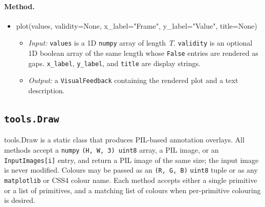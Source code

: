 \documentclass{llmxive}
\providecommand{\apicode}[1]{#1}
\begin{document}
\paragraph{Method.}
\begin{itemize}[leftmargin=1.5em]
\item \apicode{plot(values, validity=None, x_label="Frame", y_label="Value", title=None)}
  \begin{itemize}
  \item \emph{Input:} \texttt{values} is a 1D \texttt{numpy} array of length~$T$. \texttt{validity} is an optional 1D boolean array of the same length whose \texttt{False} entries are rendered as gaps. \texttt{x\_label}, \texttt{y\_label}, and \texttt{title} are display strings.
  \item \emph{Output:} a \texttt{VisualFeedback} containing the rendered plot and a text description.
  \end{itemize}
\end{itemize}

\subsection{\texttt{tools.Draw}}
\label{app:tool_draw}
\apicode{tools.Draw} is a static class that produces PIL-based annotation overlays. All methods accept a \texttt{numpy} \texttt{(H, W, 3) uint8} array, a PIL image, or an \texttt{InputImages[i]} entry, and return a PIL image of the same size; the input image is never modified. Colours may be passed as an \texttt{(R, G, B)} \texttt{uint8} tuple or as any \texttt{matplotlib} or CSS4 colour name. Each method accepts either a single primitive or a list of primitives, and a matching list of colours when per-primitive colouring is desired.
\end{document}
